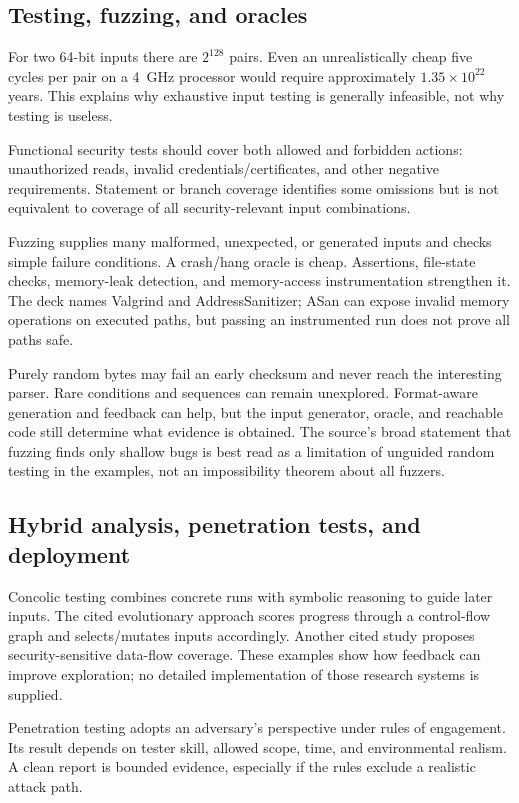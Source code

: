 \documentclass[11pt,a4paper]{article}
\numberwithin{figure}{section}
\begin{document}
\subsection{Testing, fuzzing, and oracles}
For two 64-bit inputs there are $2^{128}$ pairs. Even an unrealistically cheap five cycles per pair on a 4~GHz processor would require approximately $1.35\times10^{22}$ years. This explains why exhaustive input testing is generally infeasible, not why testing is useless.

Functional security tests should cover both allowed and forbidden actions: unauthorized reads, invalid credentials/certificates, and other negative requirements. Statement or branch coverage identifies some omissions but is not equivalent to coverage of all security-relevant input combinations.

Fuzzing supplies many malformed, unexpected, or generated inputs and checks simple failure conditions. A crash/hang oracle is cheap. Assertions, file-state checks, memory-leak detection, and memory-access instrumentation strengthen it. The deck names Valgrind and AddressSanitizer; ASan can expose invalid memory operations on executed paths, but passing an instrumented run does not prove all paths safe.

Purely random bytes may fail an early checksum and never reach the interesting parser. Rare conditions and sequences can remain unexplored. Format-aware generation and feedback can help, but the input generator, oracle, and reachable code still determine what evidence is obtained. The source's broad statement that fuzzing finds only shallow bugs is best read as a limitation of unguided random testing in the examples, not an impossibility theorem about all fuzzers.

\subsection{Hybrid analysis, penetration tests, and deployment}
Concolic testing combines concrete runs with symbolic reasoning to guide later inputs. The cited evolutionary approach scores progress through a control-flow graph and selects/mutates inputs accordingly. Another cited study proposes security-sensitive data-flow coverage. These examples show how feedback can improve exploration; no detailed implementation of those research systems is supplied.

Penetration testing adopts an adversary's perspective under rules of engagement. Its result depends on tester skill, allowed scope, time, and environmental realism. A clean report is bounded evidence, especially if the rules exclude a realistic attack path.
\end{document}
